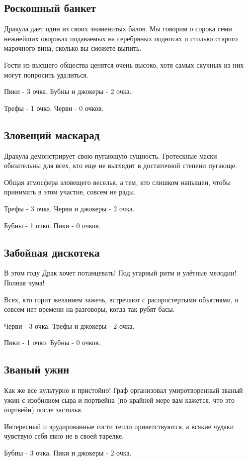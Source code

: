\documentclass[twoside,twocolumn]{article}
\begin{document}
\subsection{Роскошный банкет}
Дракула дает один из своих знаменитых балов. Мы говорим о сорока семи нежнейших окороках подаваемых на серебряных подносах и столько старого марочного вина, сколько вы сможете выпить.

Гости из высшего общества ценятся очень высоко, хотя самых скучных из них могут попросить удалиться.

Пики - 3 очка. Бубны и джокеры - 2 очка.

Трефы - 1 очко. Черви - 0 очков.

\subsection{Зловещий маскарад}
Дракула демонстрирует свою пугающую сущность. Гротескные маски обязательны для всех, кто еще не выглядит в достаточной степени пугающе.

Общая атмосфера зловещего веселья, а тем, кто слишком напыщен, чтобы принимать в этом участие, совсем не рады.

Трефы - 3 очка. Черви и джокеры - 2 очка.

Бубны - 1 очко. Пики - 0 очков.

\subsection{Забойная дискотека}
В этом году Драк хочет потанцевать! Под угарный ритм и улётные мелодии! Полная чума!

Всех, кто горит желанием зажечь, встречают с распростертыми объятиями, и совсем нет времени на разговоры, когда так рубят басы.

Черви - 3 очка. Трефы и джокеры - 2 очка.

Пики - 1 очко. Бубны - 0 очков.

\subsection{Званый ужин}
Как же все культурно и пристойно! Граф организовал умиротворенный званый ужин с изобилием сыра и портвейна (по крайней мере вам кажется, что это портвейн) после застолья.

Интересный и эрудированные гости тепло приветствуются, а всякие чудаки чувствую себя явно не в своей тарелке.

Бубны - 3 очка. Пики и джокеры - 2 очка.
\end{document}

